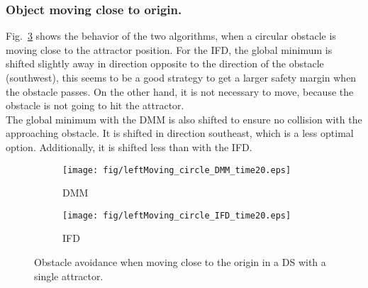 \subsubsection{Object moving close to origin.}
Fig.~\ref{fig:leftMoving_circle_fig} shows the behavior of the two algorithms, when a circular obstacle is moving close to the attractor position. For the IFD, the global minimum is shifted slightly away in direction opposite to the direction of the obstacle (southwest), this seems to be a good strategy to get a larger safety margin when the obstacle passes. On the other hand, it is not necessary to move, because the obstacle is not going to hit the attractor.\\
The global minimum with the DMM is also shifted to ensure no collision with the approaching obstacle. It is shifted in direction southeast, which is a less optimal option. Additionally, it is shifted less than with the IFD.

\begin{figure}[tb]\centering

\begin{subfigure}{.48\columnwidth} %
\centering
\texttt{[image: fig/leftMoving\_circle\_DMM\_time20.eps]}
\caption{DMM}
\label{fig:leftMoving_circle_DMM_time2}
\end{subfigure}%
\begin{subfigure}{.48\columnwidth} %
\centering
\texttt{[image: fig/leftMoving\_circle\_IFD\_time20.eps]}
\caption{IFD}
\label{fig:leftMoving_circle_IFD_time2}
\end{subfigure}
\caption{Obstacle avoidance when moving close to the origin in a DS with a single attractor.}
\label{fig:leftMoving_circle_fig}
\end{figure}



